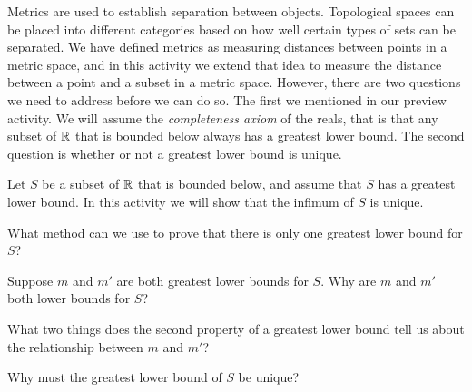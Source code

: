 
Metrics are used to establish separation between objects. Topological spaces can be placed into different categories based on how well certain types of sets can be separated. We have defined metrics as measuring distances between points in a metric space, and in this activity we extend that idea to measure the distance between a point and a subset in a metric space. However, there are two questions we need to address before we can do so. The first we mentioned in our preview activity. We will assume the \emph{completeness axiom} of the reals, that is that any subset of $\mathbb{R}$ that is bounded below always has a greatest lower bound. The second question is whether or not a greatest lower bound is unique. 

\begin{activity} Let $S$ be a subset of $\mathbb{R}$ that is bounded below, and assume that $S$ has a greatest lower bound. In this activity we will show that the infimum of $S$ is unique. 
\ba
\item What method can we use to prove that there is only one greatest lower bound for $S$?

\item Suppose $m$ and $m'$ are both greatest lower bounds for $S$. Why are $m$ and $m'$ both lower bounds for $S$?

\item What two things does the second property of a greatest lower bound tell us about the relationship between $m$ and $m'$?  

\item Why must the greatest lower bound of $S$ be unique?

\ea

\end{activity}

\begin{comment}

\ActivitySolution

\ba
\item We assume that there are two greatest lower bounds for $S$ and show that they are equal. 

\item Suppose $m$ and $m'$ are both greatest lower bounds for $S$. By definition, every greatest lower bound is also a lower bound. 

\item Since $m$ is a lower bound for $S$ and $m'$ is a greatest lower bound for $S$, it follows that $m \leq m'$. Similarly, $m'$ is a lower bound for $S$ and $m$ is a greatest lower bound for $S$ so $m' \leq m$.  

\item The two inequalities $m \leq m'$ and $m' \leq m$ show that $m = m'$ and so there is only one greatest lower bound of $S$.

\ea


\end{comment}

